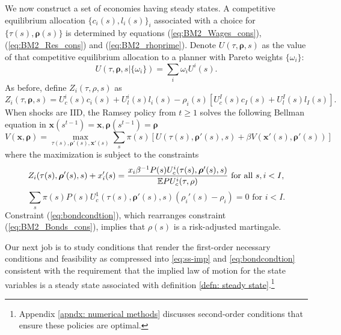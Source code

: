 \documentclass[thmsb,11pt]{article}
\begin{document}
We now construct a  set of economies having steady states. A competitive equilibrium  allocation $\{c_i(s),l_i(s)\}_{i}$ associated with a choice for $\{\tau(s), \bm{\rho}(s)\}$ is determined by
equations (\ref{eq:BM2_Wages_cons}), (\ref{eq:BM2_Res_cons}) and (\ref{eq:BM2_rhoprime}). Denote $U(\tau,\bm{\rho},s)$ as
the value of that competitive equilibrium allocation to a planner with Pareto weights $\{\omega_i\}$:
\[U(\tau,\bm{\rho},s|\{\omega_i\})=\sum_{i}\omega_i U^i(s).\]
As before, define $Z_i(\tau,\rho,s)$ as
\[Z_i(\tau,\bm \rho,s)=U^i_c(s)c_i(s)+U^i_l(s)l_i(s)-\rho_i(s)\left[U^I_c(s)c_I(s)+U^I_l(s)l_I(s)\right].\]
%
%
%
%
%
When shocks are IID,  the Ramsey  policy from $t\geq 1$ solves the following Bellman equation in $\bm{x}(s^{t-1})=\bm{x},\bm{\rho}(s^{t-1})=\bm{\rho}$
%
 \begin{equation}
 \label{eq:ss-obj}
 	V(\bm x,\bm \rho) = \max_{\tau(s),\bm \rho'(s),\bm x'(s)}\sum_s \pi(s)\left[ U(\tau(s),\bm \rho'(s),s) + \beta V(\bm x'(s),\bm \rho'(s))\right]
 \end{equation}
where the maximization is subject to the constraints
 \begin{equation}
 \label{eq:ss-imp}
 	Z_i(\tau(s),\bm \rho'(s),s) + x'_i(s) = \frac{x_i \beta^{-1}P(s) U^i_c(\tau(s),\bm \rho'(s),s)}{\mathbb{E} P U^i_c(\tau,\rho)}\text{   for all  $s,i < I$,}\\
 \end{equation}
\begin{equation}
\label{eq:bondcondtion}
 	\sum_s \pi(s)P(s)U^1_c(\tau(s),\bm \rho'(s),s)(\rho_i'(s)-\rho_i) = 0 \text{  for $i < I.$}
\end{equation}
 Constraint (\ref{eq:bondcondtion}), which rearranges constraint (\ref{eq:BM2_Bonds_cons}),  implies that $\rho(s)$ is a risk-adjusted martingale.

 Our  next job is to study conditions that render the first-order necessary conditions and feasibility as
 compressed into \eqref{eq:ss-imp} and  \eqref{eq:bondcondtion}
 consistent with the requirement that the implied  law of motion for the state variables is a steady state associated with definition \ref{defn: steady state}.\footnote{Appendix \ref{apndx: numerical methods} discusses  second-order conditions that ensure these policies are optimal.}
\end{document}
